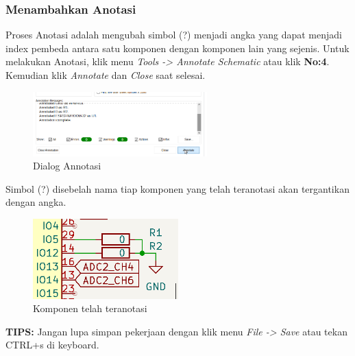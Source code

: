 \documentclass[12pt]{book}
\begin{document}
	\subsubsection{Menambahkan Anotasi}

	Proses Anotasi adalah mengubah simbol (?) menjadi angka yang dapat menjadi index pembeda antara
	satu komponen dengan komponen lain yang sejenis.
	Untuk melakukan Anotasi, klik menu \textit{Tools -> Annotate Schematic} atau klik \textbf{No:4}.
	Kemudian klik \textit{Annotate} dan \textit{Close} saat selesai.

	\begin{figure}[!ht]
		\centering
		\includegraphics[width=0.6\textwidth]{images/sch/sch_15}
		\caption{Dialog Annotasi}
	\end{figure}

	Simbol (?) disebelah nama tiap komponen yang telah teranotasi akan tergantikan dengan angka.

	\begin{figure}[!ht]
		\centering
		\includegraphics[width=0.5\textwidth]{images/sch/sch_16}
		\caption{Komponen telah teranotasi}
	\end{figure}

	\textbf{TIPS:} Jangan lupa simpan pekerjaan dengan klik menu \textit{File -> Save} atau tekan CTRL+s di keyboard.
\end{document}
